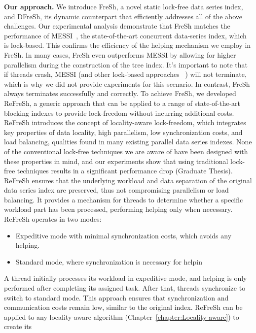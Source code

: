 \noindent
{\bf Our approach.}
We introduce FreSh, a novel static lock-free data series index, and DFreSh, 
its dynamic counterpart that efficiently addresses all of the above challenges. 
% 
Our experimental analysis demonstrate that FreSh matches the performance of 
MESSI~\cite{PFP21-I}, the state-of-the-art concurrent data-series index, which is lock-based. 
This confirms the efficiency of the helping mechanism we employ in FreSh. In many cases, 
FreSh even outperforms MESSI by allowing for higher parallelism during the construction of the
tree index.
It's important to note that if threads crash, MESSI (and other lock-based approaches
~\cite{peng2018paris,PFP21-I,PFP21-II,hercules}) will not terminate, which is 
why we did not provide experiments for this scenario. In contrast, 
FreSh always terminates successfully and correctly.
%
To achieve FreSh, we developed ReFreSh, a generic approach that can be applied to a
range of state-of-the-art blocking indexes to provide lock-freedom without 
incurring additional costs. 
%
ReFreSh introduces the concept of locality-aware lock-freedom, which integrates
key properties of data locality, high parallelism, low synchronization costs,
and load balancing, qualities found in many existing parallel data series indexes.
None of the conventional lock-free techniques we are aware of have been designed with
these properties in mind, and our experiments show that using traditional lock-free
techniques results in a significant performance drop (Graduate Thesis).
%
ReFreSh ensures that the underlying workload and data separation of the original data series
index are preserved, thus not compromising parallelism or load balancing. It provides a mechanism
for threads to determine whether a specific workload part has been processed, performing helping
only when necessary. ReFreSh operates in two modes:
\begin{itemize}
    \item Expeditive mode with minimal synchronization costs, which avoids any helping.
    \item Standard mode, where synchronization is necessary for helpin
\end{itemize}
%
A thread initially processes its workload in expeditive mode, and helping is only performed
after completing its assigned task. After that, threads synchronize to switch to standard mode.
This approach ensures that synchronization and communication costs remain low, similar to the
original index.
%
ReFreSh can be applied to any locality-aware algorithm (Chapter~\ref{chapter:Locality-aware}) to create its
